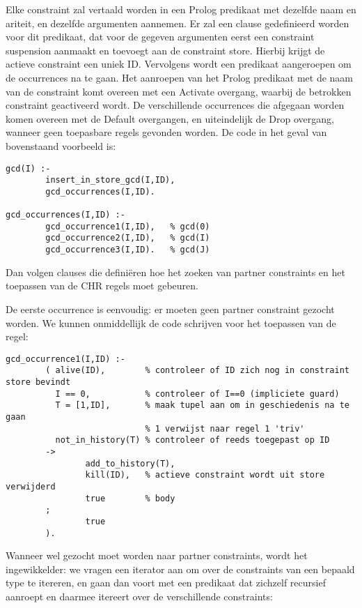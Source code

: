 Elke constraint zal vertaald worden in een Prolog predikaat met dezelfde naam en ariteit, en dezelfde argumenten aannemen. Er zal een clause gedefinieerd worden voor dit predikaat, dat voor de gegeven argumenten eerst een constraint suspension aanmaakt en toevoegt aan de constraint store. Hierbij krijgt de actieve constraint een uniek ID. Vervolgens wordt een predikaat aangeroepen om de occurrences na te gaan. Het aanroepen van het Prolog predikaat met de naam van de constraint komt overeen met een Activate overgang, waarbij de betrokken constraint geactiveerd wordt. De verschillende occurrences die afgegaan worden komen overeen met de Default overgangen, en uiteindelijk de Drop overgang, wanneer geen toepasbare regels gevonden worden. De code in het geval van bovenstaand voorbeeld is:

{\scriptsize \begin{Verbatim}[frame=single]
gcd(I) :-
        insert_in_store_gcd(I,ID),
        gcd_occurrences(I,ID).

gcd_occurrences(I,ID) :-
        gcd_occurrence1(I,ID),   % gcd(0)
        gcd_occurrence2(I,ID),   % gcd(I)
        gcd_occurrence3(I,ID).   % gcd(J)
\end{Verbatim}
}

Dan volgen clauses die defini\"eren hoe het zoeken van partner constraints en het toepassen van de CHR regels moet gebeuren.

De eerste occurrence is eenvoudig: er moeten geen partner constraint gezocht worden. We kunnen onmiddellijk de code schrijven voor het toepassen van de regel:

{\scriptsize \begin{Verbatim}[frame=single]
gcd_occurrence1(I,ID) :-
        ( alive(ID),        % controleer of ID zich nog in constraint store bevindt
          I == 0,           % controleer of I==0 (impliciete guard)
          T = [1,ID],       % maak tupel aan om in geschiedenis na te gaan
                            % 1 verwijst naar regel 1 'triv'
          not_in_history(T) % controleer of reeds toegepast op ID
        ->
                add_to_history(T),
                kill(ID),   % actieve constraint wordt uit store verwijderd
                true        % body
        ;
                true
        ).
\end{Verbatim}
}

Wanneer wel gezocht moet worden naar partner constraints, wordt het ingewikkelder: we vragen een iterator aan om over de constraints van een bepaald type te itereren, en gaan dan voort met een predikaat dat zichzelf recursief aanroept en daarmee itereert over de verschillende constraints:

